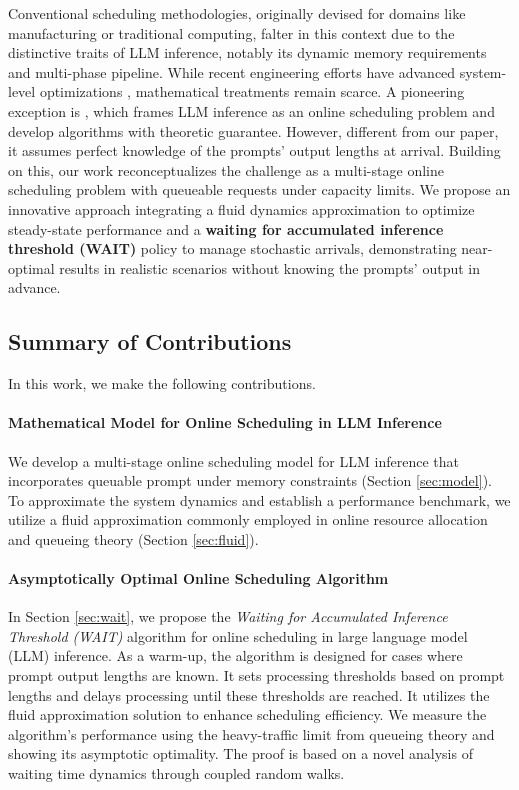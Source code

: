 Conventional scheduling methodologies, originally devised for domains like manufacturing or traditional computing, falter in this context due to the distinctive traits of LLM inference, notably its dynamic memory requirements and multi-phase pipeline. While recent engineering efforts have advanced system-level optimizations \citep{yu2022orca, kwon2023efficient, agrawal2023sarathi, pope2023efficiently,deepseekai2024deepseekv2strongeconomicalefficient,deepseekai2025deepseekv3technicalreport, sheng2023flexgen, patel2024splitwise, zhong2024distserve}, mathematical treatments remain scarce. A pioneering exception is \citet{jaillet2025onlineschedulingllminference}, which frames LLM inference as an online scheduling problem and develop algorithms with theoretic guarantee. However, different from our paper, it assumes perfect knowledge of the prompts' output lengths at arrival. Building on this, our work reconceptualizes the challenge as a multi-stage online scheduling problem with queueable requests under capacity limits. We propose an innovative approach integrating a fluid dynamics approximation to optimize steady-state performance and a \textbf{waiting for accumulated inference threshold (WAIT)} policy to manage stochastic arrivals, demonstrating near-optimal results in realistic scenarios without knowing the prompts' output in advance.

\subsection{Summary of Contributions}
In this work, we make the following contributions.
\paragraph*{Mathematical Model for Online Scheduling in LLM Inference}
We develop a multi-stage online scheduling model for LLM inference that incorporates queuable prompt under memory constraints (Section \ref{sec:model}). To approximate the system dynamics and establish a performance benchmark, we utilize a fluid approximation commonly employed in online resource allocation and queueing theory (Section \ref{sec:fluid}). 

\paragraph*{Asymptotically Optimal Online Scheduling Algorithm}
In Section \ref{sec:wait}, we propose the \textit{Waiting for Accumulated Inference Threshold (WAIT)} algorithm for online scheduling in large language model (LLM) inference. As a warm-up, the algorithm is designed for cases where prompt output lengths are known. It sets processing thresholds based on prompt lengths and delays processing until these thresholds are reached. It utilizes the fluid approximation solution to enhance scheduling efficiency. We measure the algorithm's performance using the heavy-traffic limit from queueing theory and showing its asymptotic optimality. The proof is based on a novel analysis of waiting time dynamics through coupled random walks.

